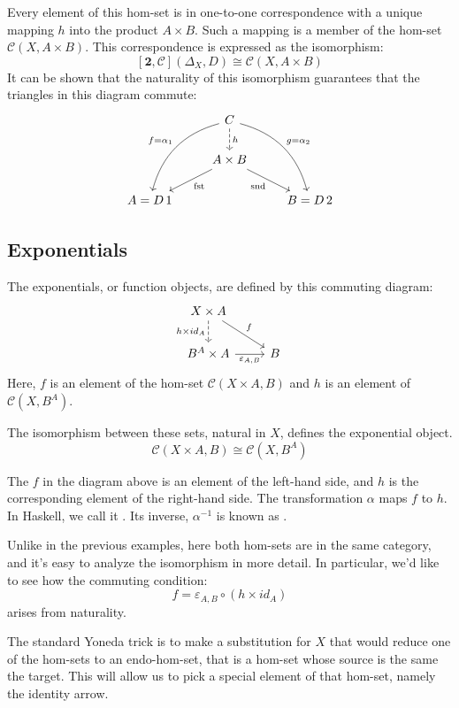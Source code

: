 \documentclass[DaoFP]{subfiles}
\begin{document}
Every element of this hom-set is in one-to-one correspondence with a unique mapping $h$ into the product $A \times B$. Such a mapping is a member of the hom-set $\mathcal{C}(X, A \times B)$. This correspondence is expressed as the isomorphism:
\[ [\mathbf{2}, \mathcal{C}](\Delta_X, D)  \cong \mathcal{C}(X, A \times B) \]
It can be shown that the naturality of this isomorphism guarantees that the triangles in this diagram commute:
\[
 \begin{tikzcd}
 & C 
\arrow[d, dashed, "h"]
 \arrow[ddl, bend right, "f = \alpha_1"']
 \arrow[ddr, bend left, "g = \alpha_2"]
\\
&A \times B
 \arrow[dl,  "\text{fst}"]
  \arrow[dr,   "\text{snd}"']
\\
A = D\, 1 && B = D \, 2
 \end{tikzcd}
\]

\subsection{Exponentials}

The exponentials, or function objects, are defined by this commuting diagram:
\[
 \begin{tikzcd}
 X \times A
 \arrow[d, dashed, "h \times id_A"']
 \arrow[rd, "f"]
 \\
 B^A \times A
 \arrow[r, "\varepsilon_{A, B}"']
& B
 \end{tikzcd}
\]
Here, $f$ is an element of the hom-set $\mathcal{C}(X \times A, B)$ and $h$ is an element of $\mathcal{C}(X, B^A)$. 

The isomorphism between these sets, natural in $X$, defines the exponential object. 
\[\mathcal{C}(X \times A, B) \cong \mathcal{C}(X, B^A)\]

The $f$ in the diagram above is an element of the left-hand side, and $h$ is the corresponding element of the right-hand side. The transformation $\alpha$ maps $f$ to $h$. In Haskell, we call it . Its inverse, $\alpha^{-1}$ is known as .

Unlike in the previous examples, here both hom-sets are in the same category, and it's easy to analyze the isomorphism in more detail. In particular, we'd like to see how the commuting condition:
\[  f = \varepsilon_{A, B} \circ (h \times id_A) \]
arises from naturality.

The standard Yoneda trick is to make a substitution for $X$ that would reduce one of the hom-sets to an endo-hom-set, that is a hom-set whose source is the same the target. This will allow us to pick a special element of that hom-set, namely the identity arrow.
\end{document}
